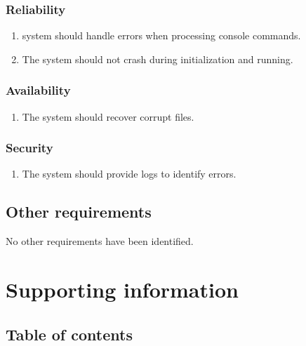 \documentclass[12pt]{article}
\begin{document}
	\subsubsection{Reliability}
	\begin{enumerate}
		\item system should handle errors when processing console commands.
		\item The system should not crash during initialization and running.
	\end{enumerate}
	
	\subsubsection{Availability}
	\begin{enumerate}
		\item The system should recover corrupt files.
	\end{enumerate}
	
	\subsubsection{Security}
	\begin{enumerate}
		\item The system should provide logs to identify errors.
	\end{enumerate}
	
	\subsection{Other requirements}
	No other requirements have been identified.
	
	\clearpage
	\section{Supporting information}
	\subsection{Table of contents}
	\vspace{-0.5 in}
	\tableofcontents
\end{document}
